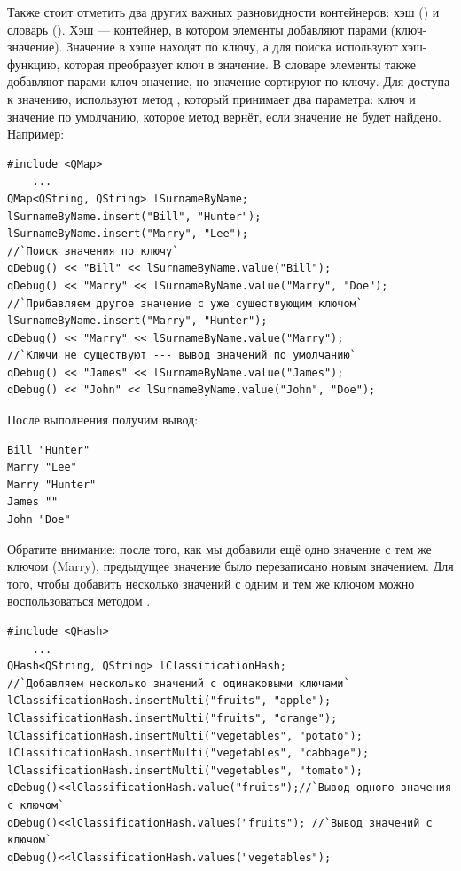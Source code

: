 Также стоит отметить два других важных разновидности контейнеров: хэш
() и словарь
(). Хэш --- контейнер, в котором элементы добавляют парами
(ключ-значение). Значение в хэше находят по
ключу, а для поиска используют хэш-функцию, которая преобразует ключ
в значение. В словаре элементы также добавляют парами ключ-значение, но значение
сортируют по ключу. Для доступа к значению, используют метод , который принимает два
параметра: ключ и значение по умолчанию, которое метод вернёт, если значение не будет
найдено. Например:
\begin{lstlisting}
#include <QMap>
    ...
QMap<QString, QString> lSurnameByName;
lSurnameByName.insert("Bill", "Hunter");
lSurnameByName.insert("Marry", "Lee");
//`Поиск значения по ключу`
qDebug() << "Bill" << lSurnameByName.value("Bill");
qDebug() << "Marry" << lSurnameByName.value("Marry", "Doe");
//`Прибавляем другое значение с уже существующим ключом`
lSurnameByName.insert("Marry", "Hunter");
qDebug() << "Marry" << lSurnameByName.value("Marry");
//`Ключи не существуют --- вывод значений по умолчанию`
qDebug() << "James" << lSurnameByName.value("James");
qDebug() << "John" << lSurnameByName.value("John", "Doe");
\end{lstlisting}

После выполнения получим вывод:
\begin{verbatim}
Bill "Hunter" 
Marry "Lee" 
Marry "Hunter" 
James "" 
John "Doe"
\end{verbatim}

Обратите внимание: после того, как мы добавили ещё одно значение с тем же ключом (Marry),
предыдущее значение было перезаписано новым
значением. Для того, чтобы добавить несколько значений с одним и тем же ключом можно
воспользоваться методом .
\begin{lstlisting}
#include <QHash>
    ...
QHash<QString, QString> lClassificationHash;
//`Добавляем несколько значений с одинаковыми ключами`
lClassificationHash.insertMulti("fruits", "apple");
lClassificationHash.insertMulti("fruits", "orange");
lClassificationHash.insertMulti("vegetables", "potato");
lClassificationHash.insertMulti("vegetables", "cabbage");
lClassificationHash.insertMulti("vegetables", "tomato");
qDebug()<<lClassificationHash.value("fruits");//`Вывод одного значения с ключом`
qDebug()<<lClassificationHash.values("fruits"); //`Вывод значений с ключом`
qDebug()<<lClassificationHash.values("vegetables");
\end{lstlisting}

